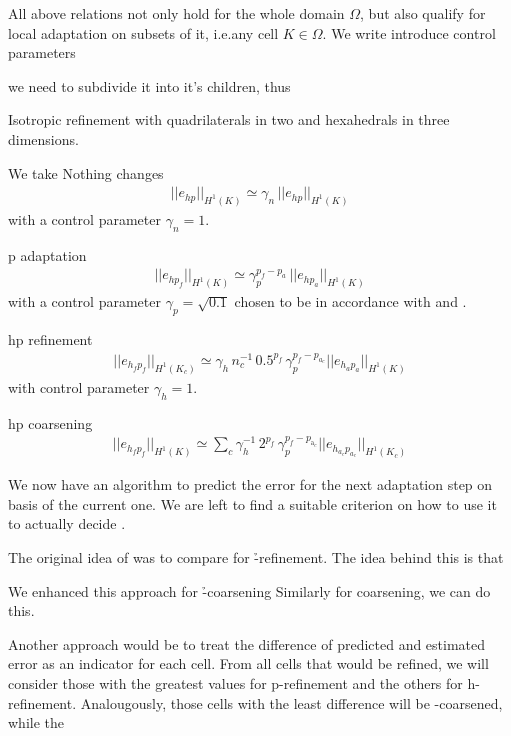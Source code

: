 
All above relations not only hold for the whole domain $\Omega$, but also qualify for local adaptation on subsets of it, i.e.\@ any cell $K \in \Omega$. We write introduce control parameters

we need to subdivide it into it's children, thus

Isotropic refinement with quadrilaterals in two and hexahedrals in three dimensions.

We take
Nothing changes
\begin{align}
\label{eq:nothing} ||e_{h p}||_{H^1(K)} \simeq \gamma_n \, ||e_{h p}||_{H^1(K)}
\end{align}
with a control parameter \(\gamma_n = 1\).

p adaptation
\begin{align}
\label{eq:p_adaptation} ||e_{h p_f}||_{H^1(K)} \simeq \gamma_p^{p_f-p_a} \, ||e_{h p_a}||_{H^1(K)}
\end{align}
with a control parameter \(\gamma_p = \sqrt{0.1}\) chosen to be in accordance with \cite{melenk2001} and \cite{mitchell2014}.

hp refinement
\begin{align}
\label{eq:hp_refinement} ||e_{h_f p_f}||_{H^1(K_c)} \simeq \gamma_h \, n_c^{-1} \, 0.5^{p_f} \, \gamma_p^{p_f - p_{a_c}} ||e_{h_a p_a}||_{H^1(K)}
\end{align}
with control parameter \(\gamma_h = 1\).

hp coarsening
\begin{align}
\label{eq:hp_coarsening} ||e_{h_f p_f}||_{H^1(K)} \simeq \sum\limits_{c} \gamma_h^{-1} \, 2^{p_f} \, \gamma_p^{p_f - p_{\text{a}_c}} ||e_{h_{a_c} p_{a_c}}||_{H^1(K_c)}
\end{align}


We now have an algorithm to predict the error for the next adaptation step on basis of the current one. We are left to find a suitable criterion on how to use it to actually decide .

The original idea of \cite{melenk2001} was to compare  for \h-refinement.
The idea behind this is that

We enhanced this approach for \h-coarsening
Similarly for coarsening, we can do this.

Another approach would be to treat the difference of predicted and estimated error as an indicator for each cell. From all cells that would be refined, we will consider those with the greatest values for p-refinement and the others for h-refinement. Analougously, those cells with the least difference will be \p-coarsened, while the

